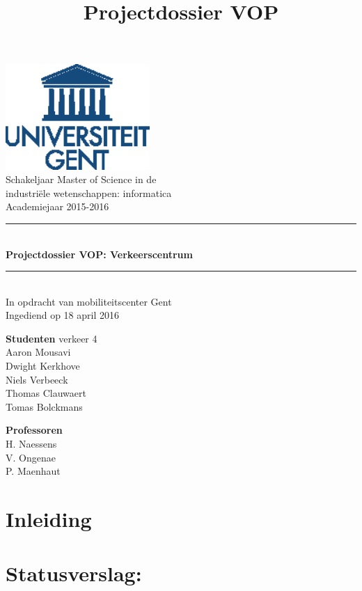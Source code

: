 \documentclass[a4paper]{article}
\title{Projectdossier VOP}
\newcommand{\HRule}{\rule{\linewidth}{0.5mm}}
\newcommand{\studenten} {Aaron Mousavi\\Dwight Kerkhove\\Niels Verbeeck\\Thomas Clauwaert\\Tomas Bolckmans}
\newcommand{\begeleiders}{H. Naessens\\V. Ongenae\\P. Maenhaut}
\newcommand{\titel}{Projectdossier VOP: Verkeerscentrum}
\newcommand{\ondertitel}{In opdracht van mobiliteitscenter Gent}
\newcommand{\datum}{18 april 2016}
\newcommand{\academiejaar}{2015-2016}
\begin{document}
\begin{titlepage}
\begin{center}
\includegraphics[height=4cm]{images/Ugentlogo.eps}\\[.5cm]

Schakeljaar Master of Science in de\\
industriële wetenschappen: informatica\\
Academiejaar \academiejaar{}

\vfill

\HRule \\[0.4cm]
{\huge \bfseries \titel{}}\\[0.4cm]
\HRule \\[0.4cm]

{\Large \ondertitel{}}\\[0.4cm]

Ingediend op \datum{}

\vfill
\begin{minipage}{0.49\textwidth}
\begin{flushleft}
\textbf{Studenten} verkeer 4\\
\studenten{}
\end{flushleft}
\end{minipage}
\begin{minipage}{0.49\textwidth}
\begin{flushright}
\textbf{Professoren}\\
\begeleiders{}\\
\end{flushright}
\end{minipage}

\end{center}
\end{titlepage}

\tableofcontents
\newpage

\section{Inleiding}
\label{sec:inleiding}
\lipsum[56]

\section{Statusverslag:}
\label{sec:statusverslag}
\end{document}
